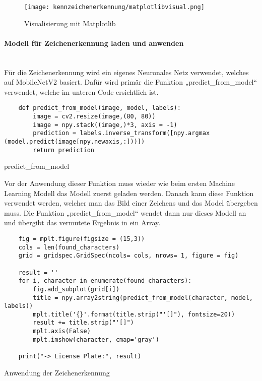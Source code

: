 \begin{figure}[H]
    \centering
    \texttt{[image: kennzeichenerkennung/matplotlibvisual.png]}
    \caption{Visualisierung mit Matplotlib}
\end{figure}

\paragraph{Modell für Zeichenerkennung laden und anwenden}\mbox{}\\

Für die Zeichenerkennung wird ein eigenes Neuronales Netz verwendet, welches auf MobileNetV2 basiert. Dafür wird primär die Funktion „predict{\_}from{\_}model“ 
verwendet, welche im unteren Code ersichtlich ist.

\begin{listing}[H]
    \begin{verbatim}
    def predict_from_model(image, model, labels):
        image = cv2.resize(image,(80, 80))
        image = npy.stack((image,)*3, axis = -1)
        prediction = labels.inverse_transform([npy.argmax (model.predict(image[npy.newaxis,:]))])
        return prediction
    \end{verbatim}
    \caption{predict{\_}from{\_}model}
\end{listing}

Vor der Anwendung dieser Funktion muss wieder wie beim ersten Machine Learning Modell das Modell zuerst geladen werden. Danach kann diese Funktion verwendet werden, 
welcher man das Bild einer Zeichens und das Model übergeben muss. Die Funktion „predict{\_}from{\_}model“ wendet dann nur dieses Modell an und übergibt das 
vermutete Ergebnis in ein Array.

\begin{longlisting}
    \begin{verbatim}
    fig = mplt.figure(figsize = (15,3))
    cols = len(found_characters)
    grid = gridspec.GridSpec(ncols= cols, nrows= 1, figure = fig)

    result = ''
    for i, character in enumerate(found_characters):
        fig.add_subplot(grid[i])
        title = npy.array2string(predict_from_model(character, model, labels))
        mplt.title('{}'.format(title.strip("'[]"), fontsize=20))
        result += title.strip("'[]")
        mplt.axis(False)
        mplt.imshow(character, cmap='gray')

    print("-> License Plate:", result)
    \end{verbatim}
    \caption{Anwendung der Zeichenerkennung}
\end{longlisting}


